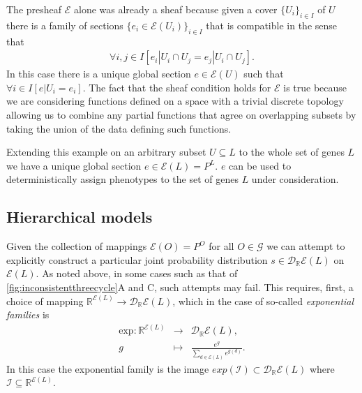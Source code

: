 The presheaf $\mathcal{E}$ alone was already a sheaf because given a cover $\{U_i\}_{i \in I}$ of $U$ there is a family of sections $\{e_i \in \mathcal{E}(U_i)\}_{i \in I}$ that is compatible in the sense that
\begin{eqnarray}
\forall i,j \in I \left[ e_i|U_i \cap U_j = e_j|U_i \cap U_j \right].
\end{eqnarray}
In this case there is a unique global section $e \in \mathcal{E}(U)$ such that $\forall i \in I \left[ e|U_i = e_i \right]$. The fact that the sheaf condition holds for $\mathcal{E}$ is true because we are considering functions defined on a space with a trivial discrete topology allowing us to combine any partial functions that agree on overlapping subsets by taking the union of the data defining such functions.

Extending this example on an arbitrary subset $U \subseteq L$ to the whole set of genes $L$ we have a unique global section $e \in \mathcal{E}(L) = P^L$. $e$ can be used to deterministically assign phenotypes to the set of genes $L$ under consideration.

\subsection{Hierarchical models}
Given the collection of mappings $\mathcal{E}(O) = P^O$ for all $O \in \mathcal{G}$ we can attempt to explicitly construct a particular joint probability distribution $s \in \mathcal{D}_{\mathbb{R}}\mathcal{E}(L)$ on $\mathcal{E}(L)$. As noted above, in some cases such as that of \ref{fig:inconsistentthreecycle}A and C, such attempts may fail. This requires, first, a choice of mapping $\mathbb{R}^{\mathcal{E}(L)} \rightarrow \mathcal{D}_{\mathbb{R}}\mathcal{E}(L)$, which in the case of so-called \emph{exponential families} is
\begin{eqnarray*}
\text{exp} \colon \mathbb{R}^{\mathcal{E}(L)} &\rightarrow& \mathcal{D}_{\mathbb{R}}\mathcal{E}(L),\\
g &\mapsto& \frac{e^g}{\sum_{d \in \mathcal{E}(L)} e^{g(d)}}.
\end{eqnarray*}
In this case the exponential family is the image $exp(\mathcal{I}) \subset \mathcal{D}_{\mathbb{R}}\mathcal{E}(L)$ where $\mathcal{I} \subseteq \mathbb{R}^{\mathcal{E}(L)}$.

